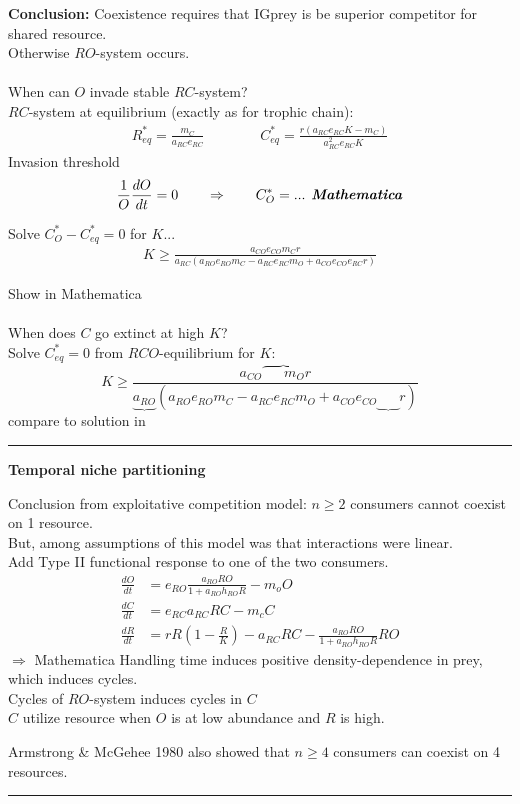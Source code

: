 \documentclass{article}
\newcommand{\note}[1]{\colorbox{gray!30}{#1}}
\newcommand{\ind}{\-\hspace{1cm}}
\newcommand*\circled[1]{\tikz[baseline=(char.base)]{
            \node[shape=circle,draw,inner sep=2pt] (char) {#1};}}
\begin{document}
\textbf{Conclusion:}  Coexistence requires that IGprey is be superior competitor for shared resource.\\
\ind Otherwise $RO$-system occurs.\\

\circled{5}\\
When can $O$ invade stable $RC$-system?\\
\ind $RC$-system at equilibrium (exactly as for trophic chain):
\begin{align*}
	R_{eq}^*=\frac{m_C}{a_{RC}e_{RC}} \qquad \qquad 	C_{eq}^*= \frac{r(a_{RC}e_{RC}K-m_C)}{a_{RC}^2 e_{RC} K}
\end{align*}
\ind Invasion threshold\\
\begin{align*}
	\frac{1}{O}\frac{dO}{dt} = 0 \qquad \Rightarrow \qquad C_O^* = ... \textbf{\emph{  Mathematica}}
\end{align*}

\ind Solve $C_O^* - C_{eq}^* = 0 $ for $K$...\
\begin{align*}
	K \geq \frac{a_{CO}e_{CO}m_C r}{ a_{RC}(a_{RO}e_{RO}m_C - a_{RC}e_{RC}m_O + a_{CO}e_{CO}e_{RC}r)}
\end{align*}

\note{Show in Mathematica}\\

\circled{6}\\
When does $C$ go extinct at high $K$?\\
\ind Solve $C_{eq}^* = 0$ from $RCO$-equilibrium for $K$:\\
\begin{equation*}
	K \geq \frac{a_{CO}\overbrace{\phantom{e_{CO}}m_O} r}{ \underbrace{a_{RO}}(a_{RO}e_{RO}m_C - a_{RC}e_{RC}m_O + a_{CO}e_{CO}\underbrace{\phantom{e_{RC}}}r )}
\end{equation*}
\ind \ind \ind \ind \ind \ind \note{compare to solution in \circled{5}}


\rule[0.5ex]{\linewidth}{1pt}
\begin{center}	\textbf{Temporal niche partitioning} \end{center}
Conclusion from exploitative competition model: $n\geq 2$ consumers cannot coexist on 1 resource.\\
But, among assumptions of this model was that interactions were linear.\\

Add Type II functional response to one of the two consumers.
\begin{align*}
	\frac{dO}{dt}&=e_{RO}\frac{a_{RO}R O}{1+a_{RO}h_{RO}R} - m_o O\\
	\frac{dC}{dt}&=e_{RC}a_{RC}RC - m_c C\\
	\frac{dR}{dt}&=r R \left(1-\frac{R}{K}\right) - a_{RC}RC - \frac{a_{RO}R O}{1+a_{RO}h_{RO}R}RO
\end{align*}
\note{$\Rightarrow$ Mathematica}
Handling time induces positive density-dependence in prey, which induces cycles.\\
Cycles of $RO$-system induces cycles in $C$\\
\ind $C$ utilize resource when $O$ is at low abundance and $R$ is high. 

Armstrong \& McGehee 1980 also showed that $n \geq 4$ consumers can coexist on 4 resources.

\rule[0.5ex]{\linewidth}{1pt}
\end{document}
